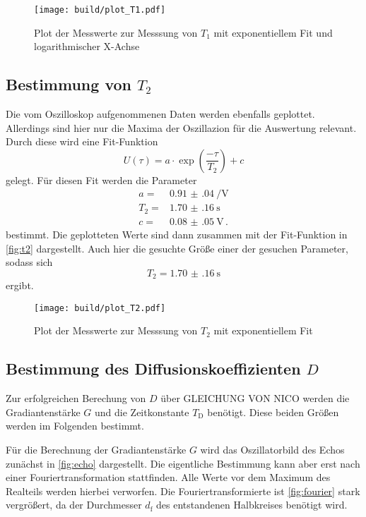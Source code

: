 \begin{figure}
    \centering
    \texttt{[image: build/plot\_T1.pdf]}
    \caption{Plot der Messwerte zur Messsung von $T_1$ mit exponentiellem Fit und logarithmischer X-Achse}
    \label{fig:t1}
\end{figure}

\subsection{Bestimmung von $T_2$}
\label{ssec:aus2}

Die vom Oszilloskop aufgenommenen Daten werden ebenfalls geplottet.
Allerdings sind hier nur die Maxima der Oszillazion für die Auswertung relevant.
Durch diese wird eine Fit-Funktion 
\begin{equation}
    U(\tau) = a \cdot \exp(\frac{- \tau}{T_2}) + c 
    \label{eq:fit_t2}
\end{equation}
gelegt.
Für diesen Fit werden die Parameter 
\begin{align*}
    a =& \SI{0.91(04)}{\per\volt} \\
    T_2 =& \SI{1.70(16)}{\second} \\
    c =& \SI{0.08(05)}{\volt} \, .
\end{align*}
bestimmt.
Die geplotteten Werte sind dann zusammen mit der Fit-Funktion in \autoref{fig:t2} dargestellt.
Auch hier die gesuchte Größe einer der gesuchen Parameter, sodass sich 
\begin{equation}
    T_2 = \SI{1.70(16)}{\second} 
    \label{eq:t2_wert}
\end{equation}
ergibt.
\begin{figure}
    \centering
    \texttt{[image: build/plot\_T2.pdf]}
    \caption{Plot der Messwerte zur Messsung von $T_2$ mit exponentiellem Fit}
    \label{fig:t2}
\end{figure}

\subsection{Bestimmung des Diffusionskoeffizienten $D$}
\label{ssec:aus3}

Zur erfolgreichen Berechung von $D$ über GLEICHUNG VON NICO werden die Gradiantenstärke $G$ und die Zeitkonstante $T_\text{D}$ benötigt. 
Diese beiden Größen werden im Folgenden bestimmt.

Für die Berechnung der Gradiantenstärke $G$ wird das Oszillatorbild des Echos zunächst in \autoref{fig:echo} dargestellt.
Die eigentliche Bestimmung kann aber erst nach einer Fouriertransformation stattfinden. 
Alle Werte vor dem Maximum des Realteils werden hierbei verworfen.
Die Fouriertransformierte ist \autoref{fig:fourier} stark vergrößert, da der Durchmesser $d_\text{f}$ des entstandenen Halbkreises benötigt wird.

